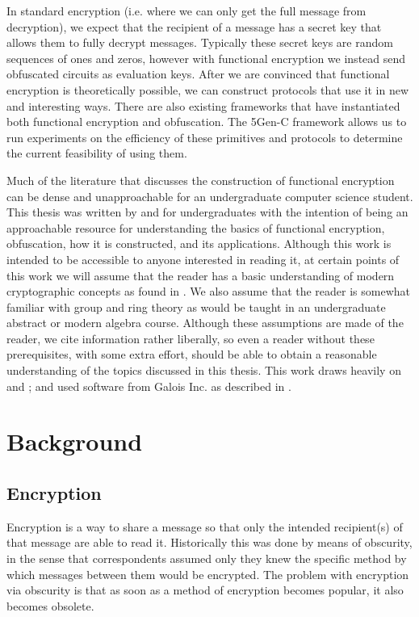 \documentclass[12pt,twoside]{reedthesis}
\begin{document}
	\par In standard encryption (i.e. where we can only get the full message from decryption), we expect that the recipient of a message has a secret key that allows them to fully decrypt messages. Typically these secret keys are random sequences of ones and zeros, however with functional encryption we instead send obfuscated circuits as evaluation keys. After we are convinced that functional encryption is theoretically possible, we can construct protocols that use it in new and interesting ways. There are also existing frameworks that have instantiated both functional encryption and obfuscation. The 5Gen-C framework allows us to run experiments on the efficiency of these primitives and protocols to determine the current feasibility of using them.
	\par Much of the literature that discusses the construction of functional encryption can be dense and unapproachable for an undergraduate computer science student. This thesis was written by and for undergraduates with the intention of being an approachable resource for understanding the basics of functional encryption, obfuscation, how it is constructed, and its applications. Although this work is intended to be accessible to anyone interested in reading it, at certain points of this work we will assume that the reader has a basic understanding of modern cryptographic concepts as found in \cite{Katz:2007:IMC:1206501}. We also assume that the reader is somewhat familiar with group and ring theory as would be taught in an undergraduate abstract or modern algebra course. Although these assumptions are made of the reader, we cite information rather liberally, so even a reader without these prerequisites, with some extra effort, should be able to obtain a reasonable understanding of the topics discussed in this thesis. This work draws heavily on \cite{Garg:2013} and \cite{GGH13}; and used software from Galois Inc. as described in \cite{5genc}.
    
   
    

    
    \chapter{Background}
    \section{Encryption}
    Encryption is a way to share a message so that only the intended recipient(s) of
    that message are able to read it. Historically this was done by means of obscurity, in the sense that correspondents assumed only they knew the specific method by which messages between them would be encrypted. The problem with encryption via obscurity is that as soon as a method of encryption becomes popular, it also becomes obsolete.
\end{document}
